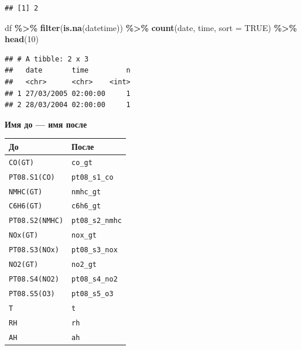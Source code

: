 \documentclass[
]{article}
\newenvironment{Shaded}{\begin{snugshade}}{\end{snugshade}}
\newcommand{\AttributeTok}[1]{\textcolor[rgb]{0.13,0.29,0.53}{#1}}
\newcommand{\ConstantTok}[1]{\textcolor[rgb]{0.56,0.35,0.01}{#1}}
\newcommand{\DecValTok}[1]{\textcolor[rgb]{0.00,0.00,0.81}{#1}}
\newcommand{\FunctionTok}[1]{\textcolor[rgb]{0.13,0.29,0.53}{\textbf{#1}}}
\newcommand{\NormalTok}[1]{#1}
\newcommand{\SpecialCharTok}[1]{\textcolor[rgb]{0.81,0.36,0.00}{\textbf{#1}}}
\newcounter{none} %
\begin{document}
\begin{Shaded}
\end{Shaded}

\begin{verbatim}
## [1] 2
\end{verbatim}

\begin{Shaded}
\begin{Highlighting}[]
\NormalTok{df }\SpecialCharTok{\%\textgreater{}\%}
  \FunctionTok{filter}\NormalTok{(}\FunctionTok{is.na}\NormalTok{(datetime)) }\SpecialCharTok{\%\textgreater{}\%}
  \FunctionTok{count}\NormalTok{(date, time, }\AttributeTok{sort =} \ConstantTok{TRUE}\NormalTok{) }\SpecialCharTok{\%\textgreater{}\%}
  \FunctionTok{head}\NormalTok{(}\DecValTok{10}\NormalTok{)}
\end{Highlighting}
\end{Shaded}

\begin{verbatim}
## # A tibble: 2 x 3
##   date       time         n
##   <chr>      <chr>    <int>
## 1 27/03/2005 02:00:00     1
## 2 28/03/2004 02:00:00     1
\end{verbatim}

\textbf{Имя до --- имя после}

{\def\LTcaptype{none} %
\begin{longtable}[]{@{}ll@{}}
\toprule\noalign{}
До & После \\
\midrule\noalign{}
\endhead
\bottomrule\noalign{}
\endlastfoot
\texttt{CO(GT)} & \texttt{co\_gt} \\
\texttt{PT08.S1(CO)} & \texttt{pt08\_s1\_co} \\
\texttt{NMHC(GT)} & \texttt{nmhc\_gt} \\
\texttt{C6H6(GT)} & \texttt{c6h6\_gt} \\
\texttt{PT08.S2(NMHC)} & \texttt{pt08\_s2\_nmhc} \\
\texttt{NOx(GT)} & \texttt{nox\_gt} \\
\texttt{PT08.S3(NOx)} & \texttt{pt08\_s3\_nox} \\
\texttt{NO2(GT)} & \texttt{no2\_gt} \\
\texttt{PT08.S4(NO2)} & \texttt{pt08\_s4\_no2} \\
\texttt{PT08.S5(O3)} & \texttt{pt08\_s5\_o3} \\
\texttt{T} & \texttt{t} \\
\texttt{RH} & \texttt{rh} \\
\texttt{AH} & \texttt{ah} \\
\end{longtable}
}
\end{document}

